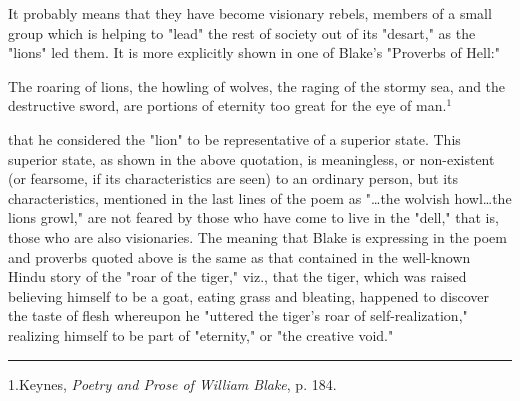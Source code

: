 It probably means that they have become visionary rebels, members of a small group which is helping to "lead" the rest
of society out of its "desart," as the "lions" led them. It is more explicitly shown in one of Blake's "Proverbs of Hell:"\par
\begin{center}
	\parbox{0.8\textwidth}{
		\hspace*{5mm}The roaring of lions, the howling of wolves, the raging of the stormy sea, and
		the destructive sword, are portions of eternity too great for the eye of man.$^{1}$
	}%
\end{center}
that he considered the "lion" to be representative of a superior state. This superior state, as shown in the above
quotation, is meaningless, or non-existent (or fearsome, if its characteristics are seen) to an ordinary person, but its characteristics,
mentioned in the last lines of the poem as "\dots the wolvish howl\dots the lions growl," are not feared by those who have come to live in the
"dell," that is, those who are also visionaries. The meaning that Blake is expressing in the poem and proverbs quoted above is the same
as that contained in the well-known Hindu story of the "roar of the tiger," viz., that the tiger, which was raised believing himself to be a goat,
eating grass and bleating, happened to discover the taste of flesh whereupon he "uttered the tiger's roar of self-realization,"
realizing himself to be part of "eternity," or "the creative void."\par
\vspace*{\fill}
\noindent\rule{0.25\textwidth}{0.4pt}\par
1.Keynes, \textit{Poetry and Prose of William Blake}, p. 184.\par

\newpage

